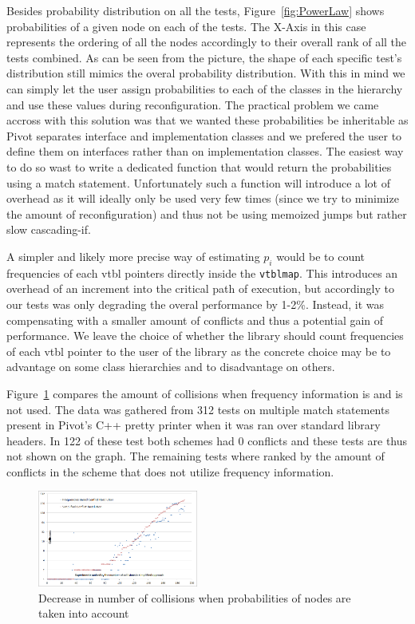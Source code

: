 \documentclass[preprint]{sigplanconf}
\makeatletter
\DeclareRobustCommand{\code}[1]{{\lstinline[breaklines=false,escapechar=@]{#1}}}
\makeatother
\begin{document}
Besides probability distribution on all the tests, Figure~\ref{fig:PowerLaw} 
shows probabilities of a given node on each of the tests. The X-Axis in this 
case represents the ordering of all the nodes accordingly to their overall rank 
of all the tests combined. As can be seen from the picture, the shape of each 
specific test's distribution still mimics the overal probability distribution. 
With this in mind we can simply let the user assign probabilities to each of the 
classes in the hierarchy and use these values during reconfiguration. The 
practical problem we came accross with this solution was that we wanted these 
probabilities be inheritable as Pivot separates interface and implementation 
classes and we prefered the user to define them on interfaces rather than on 
implementation classes. The easiest way to do so wast to write a dedicated 
function that would return the probabilities using a match statement. 
Unfortunately such a function will introduce a lot of overhead as it will 
ideally only be used very few times (since we try to minimize the amount of 
reconfiguration) and thus not be using memoized jumps but rather slow 
cascading-if.

A simpler and likely more precise way of estimating $p_i$ would be to count 
frequencies of each vtbl pointers directly inside the \code{vtblmap}. This 
introduces an overhead of an increment into the critical path of execution, but 
accordingly to our tests was only degrading the overal performance by 1-2\%.
Instead, it was compensating with a smaller amount of conflicts and thus a 
potential gain of performance. We leave the choice of whether the library should 
count frequencies of each vtbl pointer to the user of the library as the 
concrete choice may be to advantage on some class hierarchies and to 
disadvantage on others.

Figure~\ref{fig:Collisions} compares the amount of collisions when frequency 
information is and is not used. The data was gathered from 312 tests on multiple 
match statements present in Pivot's C++ pretty printer when it was ran over 
standard library headers. In 122 of these test both schemes had 0 conflicts and 
these tests are thus not shown on the graph. The remaining tests where ranked by 
the amount of conflicts in the scheme that does not utilize frequency information.

\begin{figure}[htbp]
  \centering
    \includegraphics[width=0.47\textwidth]{CollisionsWithAndWithoutFrequencies.png}
  \caption{Decrease in number of collisions when probabilities of nodes are taken into account}
  \label{fig:Collisions}
\end{figure}
\end{document}
